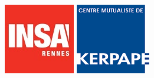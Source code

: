 \documentclass[a4paper,11pt]{article}
\begin{document}
\begin{figure}[!hbt]
   \begin{minipage}{0.3\linewidth}
      \includegraphics[width=\textwidth]{1-PreEtude/img/logo_insa.jpeg}
   \end{minipage} \hfill
   \begin{minipage}{0.3\linewidth}
      \includegraphics[width=\textwidth]{1-PreEtude/img/logo_kerpape.png}

\end{minipage}
\end{figure}
\end{document}
